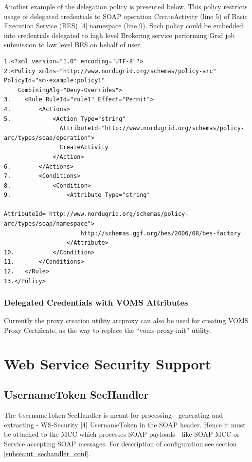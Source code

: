 \documentclass{article}                            %
\begin{document}
Another example of the delegation policy is presented below. This policy restricts usage of delegated credentials to SOAP operation CreateActivity (line 5) of Basic Execution Service (BES) [4] namespace (line 9). Such policy could be embedded into credentials delegated to high level Brokering service performing Grid job submission to low level BES on behalf of user.

\begin{verbatim}
1.<?xml version="1.0" encoding="UTF-8"?>
2.<Policy xmlns="http://www.nordugrid.org/schemas/policy-arc" PolicyId="sm-example:policy1"
    CombiningAlg="Deny-Overrides">
3.    <Rule RuleId="rule1" Effect="Permit">
4.        <Actions>
5.            <Action Type="string"
                AttributeId="http://www.nordugrid.org/schemas/policy-arc/types/soap/operation">
                CreateActivity
              </Action>
6.        </Actions>
7.        <Conditions>
8.            <Condition>
9.                <Attribute Type="string"
                      AttributeId="http://www.nordugrid.org/schemas/policy-arc/types/soap/namespace">
                      http://schemas.ggf.org/bes/2006/08/bes-factory
                  </Attribute>
10.           </Condition>
11.       </Conditions>
12.   </Rule>
13.</Policy>
\end{verbatim}

\subsubsection{Delegated Credentials with VOMS Attributes} %
\label{subsec:delegation_voms}
Currently the proxy creation utility arcproxy can also be used for creating VOMS Proxy Certificate, as the way to replace the ``voms-proxy-init'' utility.






\section{Web Service Security Support} %
\label{sec:webservice}

\subsection{UsernameToken SecHandler} %
\label{subsec:username_token}
The UsernameToken SecHandler is meant for processing - generating and extracting - WS-Security [4] UsernameToken in the SOAP header. Hence it must be attached to the MCC which processes SOAP payloads - like SOAP MCC or Service accepting SOAP messages. For description of configuration see section \ref{subsec:ut_sechandler_conf}.
\end{document}
